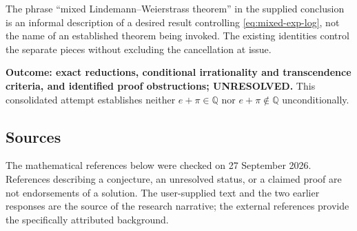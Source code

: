 \documentclass[11pt]{article}
\newcommand{\Q}{\mathbb Q}
\begin{document}
The phrase ``mixed Lindemann--Weierstrass theorem'' in the supplied
conclusion is an informal description of a desired result controlling
\eqref{eq:mixed-exp-log}, not the name of an established theorem being
invoked. The existing identities control the separate pieces without
excluding the cancellation at issue.

\textbf{Outcome: exact reductions, conditional irrationality and
transcendence criteria, and identified proof obstructions;
UNRESOLVED.} This consolidated attempt establishes neither
$e+\pi\in\Q$ nor $e+\pi\notin\Q$ unconditionally.

\subsection{Sources}
The mathematical references below were checked on 27 September 2026.
References describing a conjecture, an unresolved status, or a claimed
proof are not endorsements of a solution. The user-supplied text and the
two earlier responses are the source of the research narrative;
the external references provide the specifically attributed background.
\end{document}
